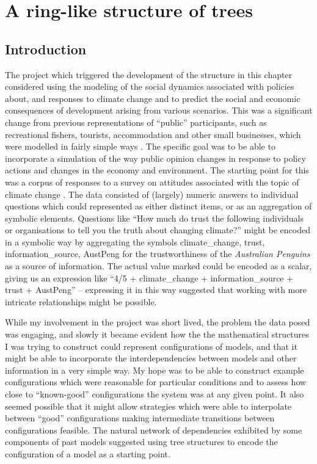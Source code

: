 
\chapter[A RING-LIKE STRUCTURE OF TREES]{A ring-like structure of trees}\label{treering}
\section{Introduction}
The project which triggered the development of the structure in this
chapter considered using the modeling of the social dynamics
associated with policies about, and responses to climate change and to
predict the social and economic consequences of development arising
from various scenarios. This was a significant change from previous
representations of ``public'' participants, such as recreational
fishers, tourists, accommodation and other small businesses, which were
modelled in fairly simple ways \citep{fulton2011ningaloo,gray2014}.
The specific goal was to be able to incorporate a simulation of the
way public opinion changes in response to policy actions and changes
in the economy and environment.  The starting point for this was a
corpus of responses to a survey on attitudes associated with the topic
of climate change \citep{boschetti2012}. The data consisted of
(largely) numeric answers to individual questions which could
represented as either distinct items, or as an aggregation of symbolic
elements.  Questions like ``How much do trust the following
individuals or organisations to tell you the truth about changing
climate?'' might be encoded in a symbolic way by aggregating the
symbols \textsf{climate\_change, trust, information\_source, AustPeng}
for the trustworthiness of the \emph{Australian Penguins} as a source
of information. The actual value marked could be encoded as a scalar,
giving us an expression like ``\textsf{4/5 + climate\_change +
  information\_source + trust + AustPeng}'' -- expressing it in this
way suggested that working with more intricate relationships might be
possible.

While my involvement in the project was short lived, the problem the
data posed was engaging, and slowly it became evident how the the
mathematical structures I was trying to construct could represent
configurations of models, and that it might be able to incorporate the
interdependencies between models and other information in a very
simple way.  My hope was to be able to construct example
configurations which were reasonable for particular conditions and to
assess how close to ``known-good'' configurations the system was at
any given point.  It also seemed possible that it might allow
strategies which were able to interpolate between ``good''
configurations making intermediate transitions between configurations
feasible. The natural network of dependencies exhibited by some
components of past models suggested using tree structures to encode
the configuration of a model as a starting point.

